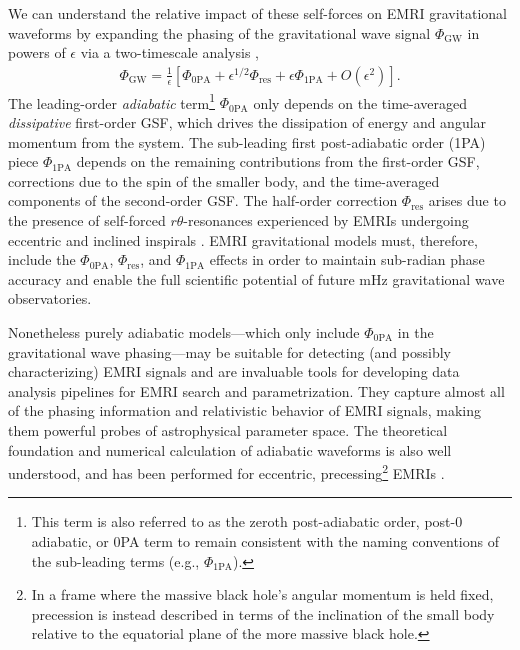 \documentclass[%
 reprint,
 nofootinbib,
 amsmath,amssymb,
 aps,
 prd,
]{revtex4-2}
\begin{document}
We can understand the relative impact of these self-forces on EMRI gravitational waveforms by expanding the phasing of the gravitational wave signal $\Phi_\mathrm{GW}$ in powers of $\epsilon$ via a two-timescale analysis \cite{HindFlan08},
\begin{align} \label{eqn:twotimescale}
\Phi_\mathrm{GW} = \frac{1}{\epsilon} \left[ \Phi_\mathrm{0PA} + \epsilon^{1/2} \Phi_\mathrm{res} + \epsilon \Phi_\mathrm{1PA} + O(\epsilon^2)\right].
\end{align}
The leading-order \emph{adiabatic} term\footnote{This term is also referred to as the zeroth post-adiabatic order, post-0 adiabatic, or 0PA term to remain consistent with the naming conventions of the sub-leading terms (e.g., $\Phi_\mathrm{1PA}$).} $\Phi_\mathrm{0PA}$ only depends on the time-averaged \emph{dissipative} first-order GSF, which drives the dissipation of energy and angular momentum from the system. The sub-leading first post-adiabatic order (1PA) piece $\Phi_\mathrm{1PA}$ depends on the remaining contributions from the first-order GSF, corrections due to the spin of the smaller body, and the time-averaged components of the second-order GSF. The half-order correction $\Phi_\mathrm{res}$ arises due to the presence of self-forced $r\theta$-resonances experienced by EMRIs undergoing eccentric and inclined inspirals \cite{FlanHind12}. EMRI gravitational models must, therefore, include the $\Phi_\mathrm{0PA}$, $\Phi_\mathrm{res}$, and $\Phi_\mathrm{1PA}$ effects in order to maintain sub-radian phase accuracy and enable the full scientific potential of future mHz gravitational wave observatories. 

Nonetheless purely adiabatic models---which only include $\Phi_\mathrm{0PA}$ in the gravitational wave phasing---may be suitable for detecting (and possibly characterizing) EMRI signals \cite{GairJone06} and are invaluable tools for developing data analysis pipelines for EMRI search and parametrization. They capture almost all of the phasing information and relativistic behavior of EMRI signals, making them powerful probes of astrophysical parameter space. The theoretical foundation and numerical calculation of adiabatic waveforms is also well understood, and has been performed for eccentric, precessing\footnote{In a frame where the massive black hole's angular momentum is held fixed, precession is instead described in terms of the inclination of the small body relative to the equatorial plane of the more massive black hole.} EMRIs \cite{HughETC21}.
\end{document}
